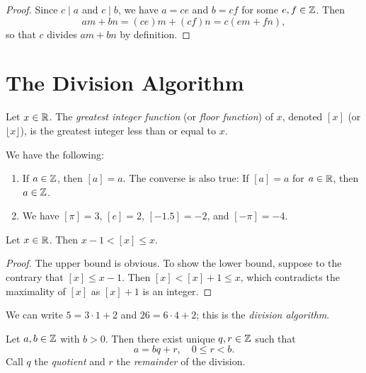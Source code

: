 \begin{proof}
  Since $c \mid a$ and $c \mid b$, we have
  $a = ce$ and $b = cf$ for some $e, f \in \mathbb{Z}$.
  Then
  \[
    am + bn = (ce)m + (cf)n
    = c(em + fn),
  \]
  so that $c$ divides $am + bn$ by definition.
\end{proof}

\section{The Division Algorithm}

\begin{definition}
  Let $x \in \mathbb{R}$. The
  \emph{greatest integer function} (or
  \emph{floor function}) of
  $x$, denoted $[x]$ (or
  $\lfloor x \rfloor$),
  is the greatest integer less than or equal
  to $x$.
\end{definition}

\begin{example}
  We have the following:
  \begin{enumerate}
    \item If $a \in \mathbb{Z}$, then $[a] = a$.
      The converse is also true:
      If $[a] = a$ for $a \in \mathbb{R}$, then
      $a \in \mathbb{Z}$.
    \item We have
      $[\pi] = 3$, $[e] = 2$, $[-1.5] = -2$,
      and $[-\pi] = -4$.
  \end{enumerate}
\end{example}

\begin{lemma}\label{lem:floor-bound}
  Let $x \in \mathbb{R}$. Then $x - 1 < [x] \le x$.
\end{lemma}

\begin{proof}
  The upper bound is obvious. To show the
  lower bound, suppose to the contrary that
  $[x] \le x - 1$. Then $[x] < [x] + 1 \le x$,
  which contradicts the maximality of $[x]$
  as $[x] + 1$ is an integer.
\end{proof}

\begin{example}
  We can write $5 = 3 \cdot 1 + 2$ and
  $26 = 6 \cdot 4 + 2$; this is
  the \emph{division algorithm}.
\end{example}

\begin{theorem}
  Let $a, b \in \mathbb{Z}$ with $b > 0$. Then there
  exist unique $q, r \in \mathbb{Z}$ such
  that
  \[
    a = bq + r, \quad 0 \le r < b.
  \]
  Call $q$ the \emph{quotient} and
  $r$ the \emph{remainder} of the division.
\end{theorem}

